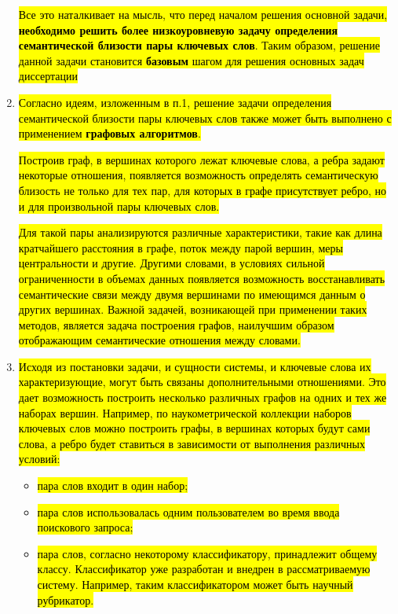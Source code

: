 \begin{enumerate}
        \hl{Все это наталкивает на мысль, что перед началом решения основной задачи, \textbf{необходимо решить более низкоуровневую задачу определения семантической близости пары ключевых слов}. Таким образом, решение данной задачи становится \textbf{базовым} шагом для решения основных задач диссертации}

    \item \hl{Согласно идеям, изложенным в п.1, решение задачи определения семантической близости пары ключевых слов также может быть выполнено с применением \textbf{графовых алгоритмов}.}

        \hl{Построив граф, в вершинах которого лежат ключевые слова, а ребра задают некоторые отношения, появляется возможность определять семантическую близость не только для тех пар, для которых в графе присутствует ребро, но и для произвольной пары ключевых слов.}
        
        \hl{Для такой пары анализируются различные характеристики, такие как длина кратчайшего расстояния в графе, поток между парой вершин, меры центральности и другие. Другими словами, в условиях сильной ограниченности в объемах данных появляется возможность восстанавливать семантические связи между двумя вершинами по имеющимся данным о других вершинах. Важной задачей, возникающей при применении таких методов, является задача построения графов, наилучшим образом отображающим семантические отношения между словами.}
      
   \item \hl{Исходя из постановки задачи, и сущности системы, и ключевые слова их характеризующие, могут быть связаны дополнительными отношениями. Это дает возможность построить несколько различных графов на одних и тех же наборах вершин. Например, по наукометрической коллекции наборов ключевых слов можно построить графы, в вершинах которых будут сами слова, а ребро будет ставиться в зависимости от выполнения различных условий:}
     \begin{itemize}
         \item \hl{пара слов входит в один набор;}
         \item \hl{пара слов использовалась одним пользователем во время ввода поискового запроса;}
         \item \hl{пара слов, согласно некоторому классификатору, принадлежит общему классу. Классификатор уже разработан и внедрен в рассматриваемую систему. Например, таким классификатором может быть научный рубрикатор.}
     \end{itemize}


\end{enumerate}
